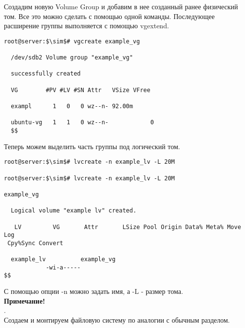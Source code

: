 \documentclass[14pt, a4paper]{article}
\begin{document}
Создадим новую Volume Group и добавим в нее созданный ранее физический том. Все это можно
сделать с помощью одной команды. Последующее расширение группы выполняется с помощью
\colorbox{backcolour}{vgextend}.

\vspace{0.3cm}

\begin{lstlisting}[mathescape=true]
root@server:$\sim$# vgcreate example_vg
  
  /dev/sdb2 Volume group "example_vg"
  
  successfully created

  VG        #PV #LV #SN Attr   VSize VFree

  exampl      1   0   0 wz--n- 92.00m

  ubuntu-vg   1   1   0 wz--n-            0
  $$
\end{lstlisting}
\vspace{0.2cm}

Теперь можем выделить часть группы под логический том.
\vspace{0.3cm}

\begin{lstlisting}[mathescape=true]
root@server:$\sim$# lvcreate -n example_lv -L 20M

root@server:$\sim$# lvcreate -n example_lv -L 20M

example_vg

  Logical volume "example lv" created.

   LV         VG       Attr       LSize Pool Origin Data% Meta% Move Log
 Cpy%Sync Convert

  example_lv          example_vg
            -wi-a-----
$$
\end{lstlisting}
\vspace{0.2cm}

С помощью опции -n можно задать имя, а -L - размер тома. \\

\textbf{Примечание!}  
\\ .\\

Создаем и монтируем файловую систему по аналогии с обычным разделом.
\vspace{0.3cm}
\end{document}
